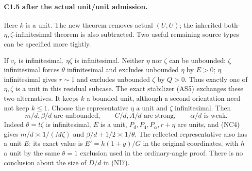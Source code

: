 \paragraph{C1.5 after the actual unit/unit admission.}
Here $k$ is a unit. The new theorem removes actual $(U,U)$; the
inherited both-$\eta,\zeta$-infinitesimal theorem is also subtracted.
Two useful remaining source types can be specified more tightly.

If $v_c$ is infinitesimal, $\eta\zeta$ is infinitesimal. Neither
$\eta$ nor $\zeta$ can be unbounded: $\zeta$ infinitesimal forces
$\theta$ infinitesimal and excludes unbounded $\eta$ by $E>0$;
$\eta$ infinitesimal gives $r\sim1$ and excludes unbounded $\zeta$
by $Q>0$. Thus exactly one of $\eta,\zeta$ is a unit in this residual
subcase. The exact stabilizer (AS5) exchanges these two alternatives.
It keeps $k$ a bounded unit, although a second orientation need not
keep $k\le1$. Choose the representative $\eta$ a unit and
$\zeta$ infinitesimal. Then
\[
 m/d,\beta/d\text{ are unbounded},\qquad
 C/d,A/d\text{ are strong},\qquad \alpha/d\text{ is weak}.
 \tag{NI7}
\]
Indeed $\theta=t\zeta$ is infinitesimal, $E$ is a unit,
$P_d,P_4,P_\alpha,r+\eta$ are units, and (NC4) gives
$m/d\asymp1/(M\zeta)$ and $\beta/d+1/2\asymp1/\theta$.
The reflected representative also has a unit $E$: its exact value
is $E'=h(1+y)/G$ in the original coordinates, with $h$ a unit by
the same $\theta=1$ exclusion used in the ordinary-angle proof.
There is no conclusion about the size of $D/d$ in (NI7).

